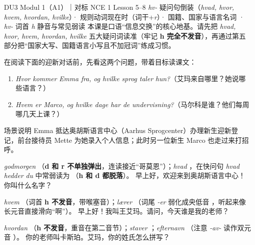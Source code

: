 {DU3 Modul 1（A1）｜对标 NCE 1 Lesson 5--8}
{\textit{hv-} 疑问句倒装（\textit{hvad, hvor, hvem, hvordan, hvilke}）· 规则动词现在时（词干+\textit{r}）· 国籍、国家与语言名词 · \textit{hv-} 词首 \textit{h} 静音与常见弱读}
{本课是口语“信息交换”的核心地基。请先把 \textit{hvad, hvor, hvem, hvordan, hvilke} 五大疑问词读准（牢记 \textbf{h 完全不发音}），再通过第五部分把“国家大写、国籍语言小写且不加冠词”练成习惯。}

\begin{foerduleaeser}
在阅读下面的迎新对话前，先看这两个问题，带着目标读课文：
\begin{enumerate}
  \item \textit{Hvor kommer Emma fra, og hvilke sprog taler hun?}（艾玛来自哪里？她说哪些语言？）
  \item \textit{Hvem er Marco, og hvilke dage har de undervisning?}（马尔科是谁？他们每周哪几天上课？）
\end{enumerate}
\end{foerduleaeser}


\begin{tipbox}{场景说明}
Emma 抵达奥胡斯语言中心（Aarhus Sprogcenter）办理新生迎新登记，前台接待员 Mette 为她录入个人信息；此时另一位新生 Marco 也走过来打招呼。
\end{tipbox}

{\textit{godmorgen} （\textbf{d 和 r 不单独弹出}，连读接近“哥莫恩”）；\textit{hvad} ，在快问句 \textit{hvad hedder du} 中常弱读为 （\textbf{h 和 d 都脱落}）。}
{早上好，欢迎来到奥胡斯语言中心！你叫什么名字？}

{\textit{hvem} （词首 \textbf{h 不发音}，带喉塞音）；\textit{lærer} （词尾 \textit{-er} 弱化成央低音 ，听起来像长元音直接滑向“啊”）。}
{早上好！我叫王艾玛。请问，今天谁是我的老师？}

{\textit{hvordan} （\textbf{h 不发音}，重音在第二音节）；\textit{staver} ；\textit{efternavn} （注意 \textit{-av-} 读作双元音 ）。}
{你的老师叫卡斯珀。艾玛，你的姓氏怎么拼写？}

